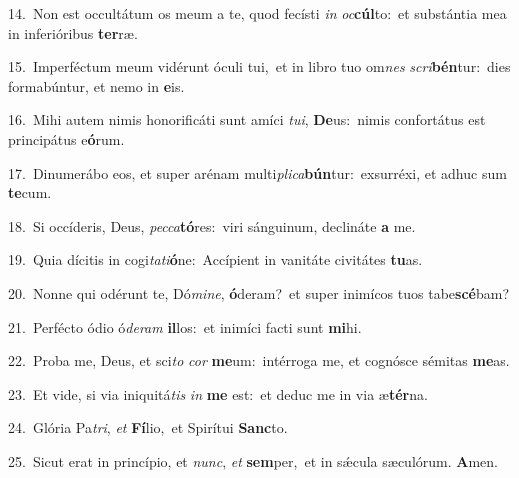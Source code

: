 {\numbfont\textcolor{\numbcolor}{14.}}~Non est occultátum os meum a te, quod fecísti \textit{in} \textit{oc}\-\textbf{cúl}to:~\star et substántia mea in inferióribus \textbf{ter}\-ræ.\par
{\numbfont\textcolor{\numbcolor}{15.}}~Imperféctum meum vidérunt óculi tui,~\dagger et in libro tuo om\textit{nes} \textit{scri}\-\textbf{bén}tur:~\star dies formabúntur, et nemo in \textbf{e}\-is.\par
{\numbfont\textcolor{\numbcolor}{16.}}~Mihi autem nimis honorificáti sunt amíci \textit{tu}\-\textit{i}, \textbf{De}\-us:~\star nimis confortátus est principátus e\-\textbf{ó}\-rum.\par
{\numbfont\textcolor{\numbcolor}{17.}}~Dinumerábo eos, et super arénam multi\-\textit{pli}\-\textit{ca}\textbf{bún}tur:~\star exsurréxi, et adhuc sum \textbf{te}\-cum.\par
{\numbfont\textcolor{\numbcolor}{18.}}~Si occíderis, Deus, \textit{pec}\-\textit{ca}\textbf{tó}res:~\star viri sánguinum, declináte \textbf{a} me.\par
{\numbfont\textcolor{\numbcolor}{19.}}~Quia dícitis in cogi\-\textit{ta}\-\textit{ti}\textbf{ó}ne:~\star Accípient in vanitáte civitátes \textbf{tu}\-as.\par
{\numbfont\textcolor{\numbcolor}{20.}}~Nonne qui odérunt te, Dó\-\textit{mi}\-\textit{ne}, \textbf{ó}\-deram?~\star et super inimícos tuos tabe\-\textbf{scé}\-bam?\par
{\numbfont\textcolor{\numbcolor}{21.}}~Perfécto ódio ó\-\textit{de}\-\textit{ram} \textbf{il}\-los:~\star et inimíci facti sunt \textbf{mi}\-hi.\par
{\numbfont\textcolor{\numbcolor}{22.}}~Proba me, Deus, et sci\textit{to} \textit{cor} \textbf{me}\-um:~\star intérroga me, et cognósce sémitas \textbf{me}\-as.\par
{\numbfont\textcolor{\numbcolor}{23.}}~Et vide, si via iniquitá\textit{tis} \textit{in} \textbf{me} est:~\star et deduc me in via æ\-\textbf{tér}\-na.\par
{\numbfont\textcolor{\numbcolor}{24.}}~Glória Pa\-\textit{tri}\-, \textit{et} \textbf{Fí}\-lio,~\star et Spirítui \textbf{Sanc}\-to.\par
{\numbfont\textcolor{\numbcolor}{25.}}~Sicut erat in princípio, et \textit{nunc}\-, \textit{et} \textbf{sem}\-per,~\star et in sǽcula sæculórum. \textbf{A}\-men.\par
